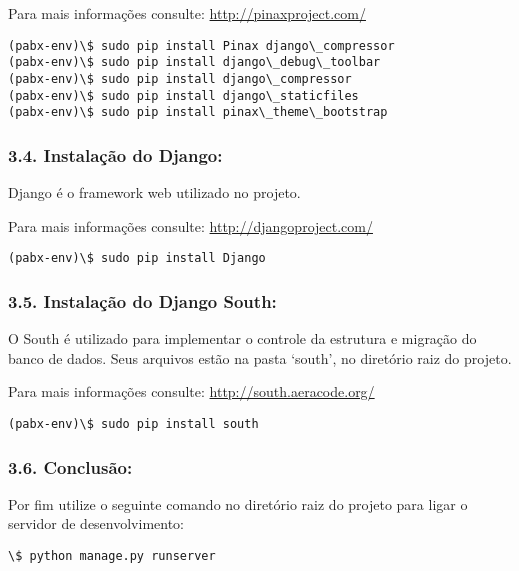 \documentclass[letterpaper,10pt,brazil]{sphinxmanual}
\begin{document}
Para mais informações consulte: \href{http://pinaxproject.com/}{http://pinaxproject.com/}

\begin{Verbatim}[commandchars=\\\{\}]
(pabx-env)\$ sudo pip install Pinax django\_compressor
(pabx-env)\$ sudo pip install django\_debug\_toolbar
(pabx-env)\$ sudo pip install django\_compressor
(pabx-env)\$ sudo pip install django\_staticfiles
(pabx-env)\$ sudo pip install pinax\_theme\_bootstrap
\end{Verbatim}


\subsubsection{3.4. Instalação do Django:}
\label{inicio:instalacao-do-django}
Django é o framework web utilizado no projeto.

Para mais informações consulte: \href{http://djangoproject.com/}{http://djangoproject.com/}

\begin{Verbatim}[commandchars=\\\{\}]
(pabx-env)\$ sudo pip install Django
\end{Verbatim}


\subsubsection{3.5. Instalação do Django South:}
\label{inicio:instalacao-do-django-south}
O South é utilizado para implementar o controle da estrutura e migração do banco de dados. Seus arquivos estão na pasta `south', no diretório raiz do projeto.

Para mais informações consulte: \href{http://south.aeracode.org/}{http://south.aeracode.org/}

\begin{Verbatim}[commandchars=\\\{\}]
(pabx-env)\$ sudo pip install south
\end{Verbatim}


\subsubsection{3.6. Conclusão:}
\label{inicio:conclusao}
Por fim utilize o seguinte comando no diretório raiz do projeto para ligar o servidor de desenvolvimento:

\begin{Verbatim}[commandchars=\\\{\}]
\$ python manage.py runserver
\end{Verbatim}
\end{document}
